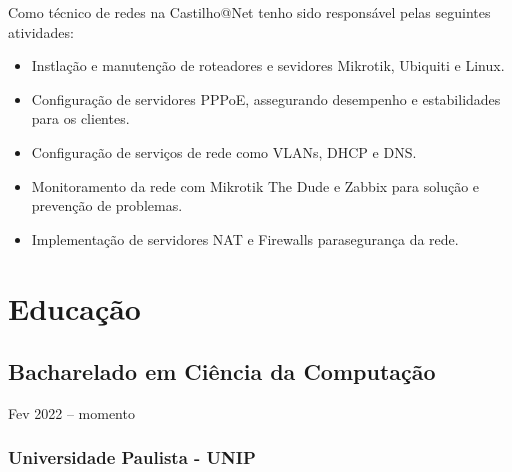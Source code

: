 \documentclass{cv}
\begin{document}
Como técnico de redes na Castilho@Net tenho sido responsável pelas
seguintes atividades:

\begin{itemize}
  \item Instlação e manutenção de roteadores e sevidores Mikrotik,
    Ubiquiti e Linux.
  \item Configuração de servidores PPPoE, assegurando desempenho e
    estabilidades para os clientes.
  \item Configuração de serviços de rede como VLANs, DHCP e DNS.
  \item Monitoramento da rede com Mikrotik The Dude e Zabbix para
    solução e prevenção de problemas.
  \item Implementação de servidores NAT e Firewalls parasegurança da rede.
\end{itemize}

\section{Educação}

\subsection{Bacharelado em Ciência da Computação}
{Fev 2022 -- momento}
\subsubsection{Universidade Paulista - UNIP}
\end{document}
